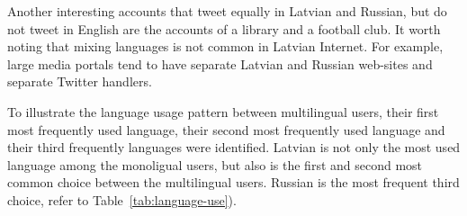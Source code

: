 \documentclass[11pt,a4paper]{article}
\begin{document}
Another interesting accounts that tweet equally in Latvian and Russian, but do not tweet in English are the accounts of a library and a football club. It worth noting that mixing languages is not common in Latvian Internet. For example, large media portals tend to have separate Latvian and Russian web-sites and separate Twitter handlers.

To illustrate the language usage pattern between multilingual users, their first most frequently used language, their second most frequently used language and their third frequently languages were identified. Latvian is not only the most used language among the monoligual users, but also is the first and second most common choice between the multilingual users. Russian is the most frequent third choice, refer to Table~\ref{tab:language-use}).





\end{document}
